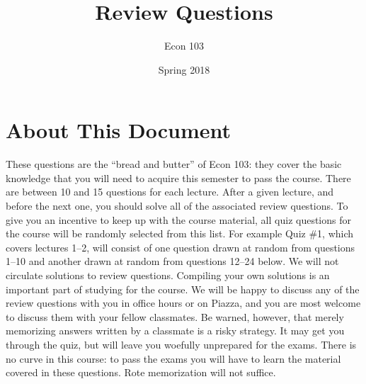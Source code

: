 \documentclass[addpoints,12pt]{exam}
\title{Review Questions}
\author{Econ 103}
\date{Spring 2018}
\begin{document}
\maketitle

\section*{About This Document}
These questions are the ``bread and butter'' of Econ 103: they cover the basic knowledge that you will need to acquire this semester to pass the course. 
There are between 10 and 15 questions for each lecture.
After a given lecture, and before the next one, you should solve all of the associated review questions.
To give you an incentive to keep up with the course material, all quiz questions for the course will be randomly selected from this list.
For example Quiz \#1, which covers lectures 1--2, will consist of one question drawn at random from questions 1--10 and another drawn at random from questions 12--24 below.
We will not circulate solutions to review questions.
Compiling your own solutions is an important part of studying for the course.
We will be happy to discuss any of the review questions with you in office hours or on Piazza, and you are most welcome to discuss them with your fellow classmates.
Be warned, however, that merely memorizing answers written by a classmate is a risky strategy.
It may get you through the quiz, but will leave you woefully unprepared for the exams.
There is no curve in this course: to pass the exams you will have to learn the material covered in these questions.
Rote memorization will not suffice.

\end{document}
